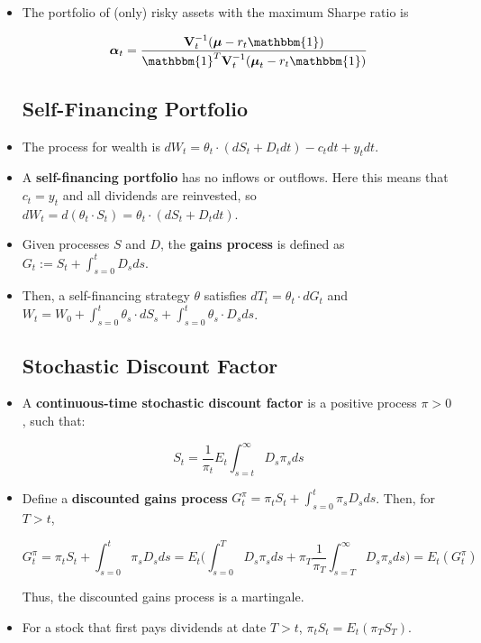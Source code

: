 \documentclass{article}
\newcommand{\Vbf}{\mathbf{V}}
\newcommand{\mubf}{\boldsymbol{\mu}}
\newcommand{\alphabf}{\boldsymbol{\alpha}}
\newcommand{\onebf}{\mathbbm{1}}
\begin{document}
\begin{itemize}
\item The portfolio of (only) risky assets with the maximum Sharpe ratio is

$$
\alphabf_t = \frac{\Vbf_t^{-1}(\mubf - r_t \onebf)}{\onebf^T \Vbf_t^{-1}(\mubf_t - r_t \onebf)}
$$

\subsection*{Self-Financing Portfolio}

\item The process for wealth is $dW_t = \theta_t \cdot (dS_t + D_t dt) - c_t dt + y_t dt$.

\item A \textbf{self-financing portfolio} has no inflows or outflows. Here this means that $c_t = y_t$ and all dividends are reinvested, so $dW_t = d(\theta_t \cdot S_t) = \theta_t \cdot (dS_t + D_t dt)$.

\item Given processes $S$ and $D$, the \textbf{gains process} is defined as $G_t := S_t + \int_{s=0}^t D_s ds$.

\item Then, a self-financing strategy $\theta$ satisfies $dT_t = \theta_t \cdot dG_t$ and $W_t = W_0 + \int_{s=0}^t \theta_s \cdot dS_s + \int_{s=0}^t \theta_s \cdot D_s ds$.

\subsection*{Stochastic Discount Factor}

\item A \textbf{continuous-time stochastic discount factor} is a positive process $\pi > 0$, such that:

$$
S_t = \frac{1}{\pi_t} E_t \int_{s=t}^\infty D_s \pi_s ds
$$

\item Define a \textbf{discounted gains process} $G_t^\pi = \pi_t S_t + \int_{s=0}^t \pi_s D_s ds$. Then, for $T > t$,

$$
G_t^\pi = \pi_t S_t +  \int_{s=0}^t \pi_s D_s ds = E_t \Bigg( \int_{s=0}^T D_s \pi_s ds + \pi_T \frac{1}{\pi_T}\int_{s=T}^\infty D_s \pi_s ds \Bigg) = E_t (G_t^\pi)
$$

Thus, the discounted gains process is a martingale.

\item For a stock that first pays dividends at date $T > t$, $\pi_t S_t = E_t (\pi_T S_T)$.


\end{itemize}
\end{document}
